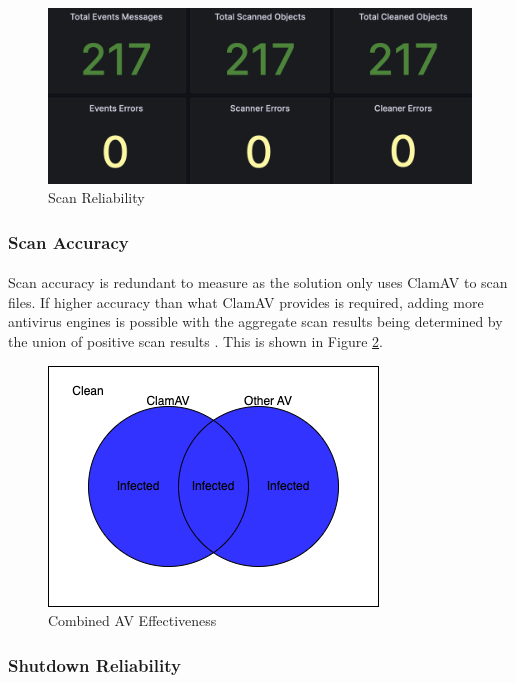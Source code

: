 \documentclass[12pt, conference, final, a4paper, onecolumn, compsoc]{IEEEtran}
\begin{document}
\begin{figure}
  \centering \includegraphics[scale=0.31]{images/scan-reliability.png}
  \caption{Scan Reliability}
  \label{fig:scan-reliability}
\end{figure}

\subsubsection*{Scan Accuracy}
\paragraph{}
Scan accuracy is redundant to measure as the solution only uses ClamAV to scan
files. If higher accuracy than what ClamAV provides is required, adding more
antivirus engines is possible with the aggregate scan results being determined
by the union of positive scan results \citep{av-comparison}. This is shown in Figure
\ref{scan-union}.

\begin{figure}[H]
  \centering \includegraphics[scale=0.45]{diagrams/scan-union.png}
  \caption{Combined AV Effectiveness}
  \label{scan-union}
\end{figure}


\subsubsection*{Shutdown Reliability}
\end{document}
